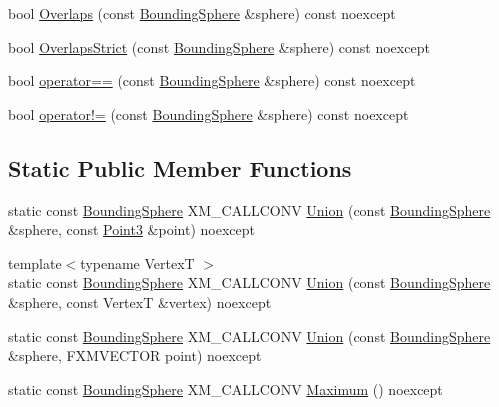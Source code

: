 \begin{DoxyCompactItemize}
\item 
bool \hyperlink{classmage_1_1_bounding_sphere_aec1440ef7a88b85ae6a310a41b5b7f20}{Overlaps} (const \hyperlink{classmage_1_1_bounding_sphere}{Bounding\+Sphere} \&sphere) const noexcept
\item 
bool \hyperlink{classmage_1_1_bounding_sphere_a352314bd02664521a516ac5d0ce4a5a4}{Overlaps\+Strict} (const \hyperlink{classmage_1_1_bounding_sphere}{Bounding\+Sphere} \&sphere) const noexcept
\item 
bool \hyperlink{classmage_1_1_bounding_sphere_adc183c59a09a071fbc78b833cc66f218}{operator==} (const \hyperlink{classmage_1_1_bounding_sphere}{Bounding\+Sphere} \&sphere) const noexcept
\item 
bool \hyperlink{classmage_1_1_bounding_sphere_a841979aaee8a82784674296801aa5fbc}{operator!=} (const \hyperlink{classmage_1_1_bounding_sphere}{Bounding\+Sphere} \&sphere) const noexcept
\end{DoxyCompactItemize}
\subsection*{Static Public Member Functions}
\begin{DoxyCompactItemize}
\item 
static const \hyperlink{classmage_1_1_bounding_sphere}{Bounding\+Sphere} X\+M\+\_\+\+C\+A\+L\+L\+C\+O\+NV \hyperlink{classmage_1_1_bounding_sphere_a519f2f7bf6439ea384d5da60557223bf}{Union} (const \hyperlink{classmage_1_1_bounding_sphere}{Bounding\+Sphere} \&sphere, const \hyperlink{structmage_1_1_point3}{Point3} \&point) noexcept
\item 
{\footnotesize template$<$typename VertexT $>$ }\\static const \hyperlink{classmage_1_1_bounding_sphere}{Bounding\+Sphere} X\+M\+\_\+\+C\+A\+L\+L\+C\+O\+NV \hyperlink{classmage_1_1_bounding_sphere_a14660f9e7b33be68fabae6d4036b4d8b}{Union} (const \hyperlink{classmage_1_1_bounding_sphere}{Bounding\+Sphere} \&sphere, const VertexT \&vertex) noexcept
\item 
static const \hyperlink{classmage_1_1_bounding_sphere}{Bounding\+Sphere} X\+M\+\_\+\+C\+A\+L\+L\+C\+O\+NV \hyperlink{classmage_1_1_bounding_sphere_af9398725d5a70f47acedfb276f5060c5}{Union} (const \hyperlink{classmage_1_1_bounding_sphere}{Bounding\+Sphere} \&sphere, F\+X\+M\+V\+E\+C\+T\+OR point) noexcept
\item 
static const \hyperlink{classmage_1_1_bounding_sphere}{Bounding\+Sphere} X\+M\+\_\+\+C\+A\+L\+L\+C\+O\+NV \hyperlink{classmage_1_1_bounding_sphere_afbdb210289e14ceeb69d62d1d0585b93}{Maximum} () noexcept
\end{DoxyCompactItemize}
